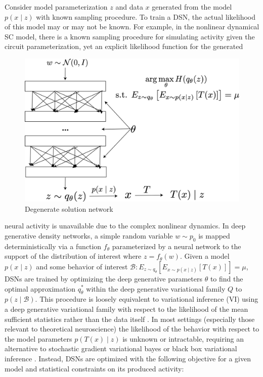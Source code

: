\documentclass[11pt]{article}
\begin{document}
Consider model parameterization $z$ and data $x$ generated from the model $p(x \mid z)$  with known sampling procedure.  To train a DSN, the actual likelihood of this model may or may not be known.  For example, in the nonlinear dynamical SC model, there is a known sampling procedure for simulating activity given the circuit parameterization, yet an explicit likelihood function for the generated 
\begin{figure}
 \caption{\label{fig:fig1} Degenerate solution network}
  \begin{center}  
\includegraphics[scale=.3]{figs/DSN.png} 
\end{center}
 \end{figure}
 neural activity is unavailable due to the complex nonlinear dynamics.  In deep generative density networks, a simple random variable $w \sim p_0$ is mapped deterministically via a function $f_\theta$ parameterized by a neural network to the support of the distribution of interest where $z = f_{\theta}(w)$.  Given a model $p(x \mid z)$ and some behavior of interest $\mathcal{B}: E_{z \sim q_\theta}\left[ E_{x\sim p(x \mid z)}\left[T(x)\right] \right] = \mu$, DSNs are trained by optimizing the deep generative parameters $\theta$ to find the optimal approximation $q_{\theta}^*$ within the deep generative variational family $Q$ to $p(z \mid \mathcal{B})$. This procedure is loosely equivalent to variational inference (VI) using a deep generative variational family with respect to the likelihood of the mean sufficient statistics rather than the data itself \cite{loaiza2017maximum, bittner2019learning}.  In most settings (especially those relevant to theoretical neuroscience) the likelihood of the behavior with respect to the model parameters $p(T(x) \mid z)$ is unknown or intractable, requiring an alternative to stochastic gradient variational bayes \cite{kingma2013auto} or black box variational inference \cite{ranganath2014black}. Instead, DSNs are optimized with the following objective for a given model and statistical constraints on its produced activity:
\end{document}
